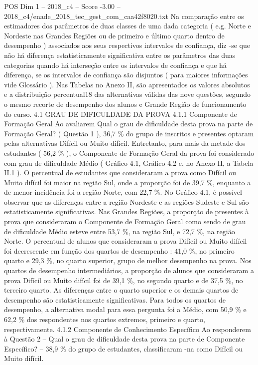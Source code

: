 \begin{textsample}{POS Dim 1 – 2018\_c4 – Score -3.00 – 2018\_c4/enade\_2018\_tec\_gest\_com\_caa42f8020.txt}
Na comparação entre os estimadores dos parâmetros de duas classes de uma dada categoria ( e.g.
Norte e Nordeste nas Grandes Regiões ou de primeiro e último quarto dentro de desempenho ) associados aos seus respectivos intervalos de confiança, diz -se que não há diferença estatisticamente significativa entre os parâmetros das duas categorias quando há interseção entre os intervalos de confiança e que há diferença, se os intervalos de confiança são disjuntos ( para maiores informações vide Glossário ).
Nas Tabelas no Anexo II, são apresentados os valores absolutos e a distribuição percentual18 das alternativas válidas das nove questões, segundo o mesmo recorte de desempenho dos alunos e Grande Região de funcionamento do curso. 4.1 GRAU DE DIFICULDADE DA PROVA 4.1.1 Componente de Formação Geral Ao avaliarem Qual o grau de dificuldade desta prova na parte de Formação Geral? ( Questão 1 ), 36,7 \% do grupo de inscritos e presentes optaram pelas alternativas Difícil ou Muito difícil.
Entretanto, para mais da metade dos estudantes ( 56,2 \% ), o Componente de Formação Geral da prova foi considerado com grau de dificuldade Médio ( Gráfico 4.1, Gráfico 4.2 e, no Anexo II, a Tabela II.1 ).
O percentual de estudantes que consideraram a prova como Difícil ou Muito difícil foi maior na região Sul, onde a proporção foi de 39,7 \%, enquanto a de menor incidência foi a região Norte, com 22,7 \%.
No Gráfico 4.1, é possível observar que as diferenças entre a região Nordeste e as regiões Sudeste e Sul são estatisticamente significativas.
Nas Grandes Regiões, a proporção de presentes à prova que consideraram o Componente de Formação Geral como sendo de grau de dificuldade Médio esteve entre 53,7 \%, na região Sul, e 72,7 \%, na região Norte.
O percentual de alunos que consideraram a prova Difícil ou Muito difícil foi decrescente em função dos quartos de desempenho : 41,0 \%, no primeiro quarto e 29,3 \%, no quarto superior, grupo de melhor desempenho na prova.
Nos quartos de desempenho intermediários, a proporção de alunos que consideraram a prova Difícil ou Muito difícil foi de 39,1 \%, no segundo quarto e de 37,5 \%, no terceiro quarto.
As diferenças entre o quarto superior e os demais quartos de desempenho são estatisticamente significativas.
Para todos os quartos de desempenho, a alternativa modal para essa pergunta foi a Médio, com 50,9 \% e 62,2 \% dos respondentes nos quartos extremos, primeiro e quarto, respectivamente. 4.1.2 Componente de Conhecimento Específico Ao responderem à Questão 2 – Qual o grau de dificuldade desta prova na parte de Componente Específico? – 38,9 \% do grupo de estudantes, classificaram -na como Difícil ou Muito difícil.

\end{textsample}
